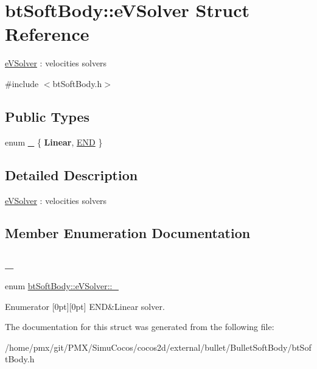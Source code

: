 \hypertarget{structbtSoftBody_1_1eVSolver}{}\section{bt\+Soft\+Body\+:\+:e\+V\+Solver Struct Reference}
\label{structbtSoftBody_1_1eVSolver}


\hyperlink{structbtSoftBody_1_1eVSolver}{e\+V\+Solver} \+: velocities solvers  




{\ttfamily \#include $<$bt\+Soft\+Body.\+h$>$}

\subsection*{Public Types}
\begin{DoxyCompactItemize}
\item 
enum \hyperlink{structbtSoftBody_1_1eVSolver_ad6a7083f91529d75cab91506cd63e088}{\+\_\+} \{ {\bfseries Linear}, 
\hyperlink{structbtSoftBody_1_1eVSolver_ad6a7083f91529d75cab91506cd63e088af9171d53f22882b6b27a94534ab72e01}{E\+ND}
 \}
\end{DoxyCompactItemize}


\subsection{Detailed Description}
\hyperlink{structbtSoftBody_1_1eVSolver}{e\+V\+Solver} \+: velocities solvers 

\subsection{Member Enumeration Documentation}
\mbox{\label{structbtSoftBody_1_1eVSolver_ad6a7083f91529d75cab91506cd63e088}} 
\subsubsection{\texorpdfstring{\+\_\+}{\_}}
{\footnotesize\ttfamily enum \hyperlink{structbtSoftBody_1_1eVSolver_ad6a7083f91529d75cab91506cd63e088}{bt\+Soft\+Body\+::e\+V\+Solver\+::\+\_\+}}

\begin{DoxyEnumFields}{Enumerator}
[0pt][0pt]{}\mbox{\label{structbtSoftBody_1_1eVSolver_ad6a7083f91529d75cab91506cd63e088af9171d53f22882b6b27a94534ab72e01}} 
E\+ND&Linear solver. \\
\hline

\end{DoxyEnumFields}


The documentation for this struct was generated from the following file\+:\begin{DoxyCompactItemize}
\item 
/home/pmx/git/\+P\+M\+X/\+Simu\+Cocos/cocos2d/external/bullet/\+Bullet\+Soft\+Body/bt\+Soft\+Body.\+h\end{DoxyCompactItemize}
